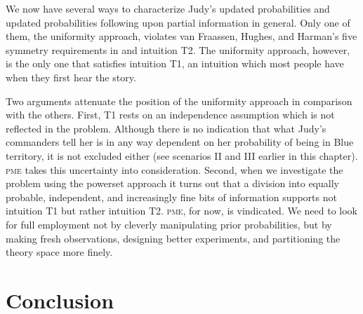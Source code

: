 \documentclass[phd,12pt,oneside]{ubcthesis}
\begin{document}
We now have several ways to characterize Judy's updated
probabilities and updated probabilities following upon partial
information in general. Only one of them, the uniformity approach,
violates van Fraassen, Hughes, and Harman's five symmetry requirements
in  and intuition T2. The uniformity
approach, however, is the only one that satisfies intuition T1, an
intuition which most people have when they first hear the story. 

Two arguments attenuate the position of the uniformity approach in
comparison with the others. First, T1 rests on an independence
assumption which is not reflected in the problem. Although there is no
indication that what Judy's commanders tell her is in any way
dependent on her probability of being in Blue territory, it is not
excluded either (see scenarios II and III earlier in this chapter).
\textsc{pme} takes this uncertainty into consideration. Second,
when we investigate the problem using the powerset approach it turns
out that a division into equally probable, independent, and
increasingly fine bits of information supports not intuition T1 but
rather intuition T2. \textsc{pme}, for now, is vindicated. We need
to look for full employment not by cleverly manipulating prior
probabilities, but by making fresh observations, designing better
experiments, and partitioning the theory space more finely.

\chapter{Conclusion}
\label{chp:zeetahgh}


\end{document}

